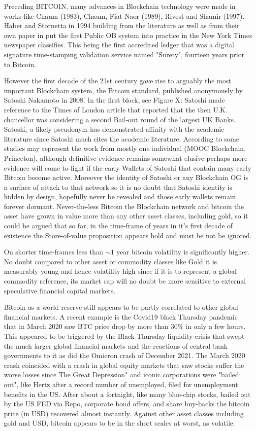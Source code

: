 \documentclass[final,5p,times,twocolumn,authoryear]{elsarticle}
\begin{document}
Preceding BITCOIN, many advances in Blockchain technology were made in works like Chaum (1983), Chaum, Fiat Naor (1989), Rivest and Shamir (1997). Haber and Stornetta in 1994 building from the literature as well as from their own paper in \cite{Haber1991wi} put the first Public OB system into practice in the New York Times newspaper classifies. This being the first accredited ledger that was a digital signature time-stamping validation service named "Surety", fourteen years prior to Bitcoin. 

However the first decade of the 21st century gave rise to arguably the most important Blockchain system, the Bitcoin standard, published anonymously by Satoshi Nakamoto in 2008.  In the first block, see Figure X: Satoshi made reference to the Times of London article that reported that the then U.K. chancellor was considering a second Bail-out round of the largest UK Banks. Satoshi, a likely pseudonym has demonstrated affinity with the academic literature since Satoshi much cites the academic literature. According to some studies may represent the work from mostly one individual (MOOC Blockchain, Princeton), although definitive evidence remains somewhat elusive perhaps more evidence will come to light if the early Wallets of Satoshi that contain many early Bitcoin become active. Moreover the identity of Satoshi or any Blockchain OG is a surface of attack to that network so it is no doubt that Satoshi identity is hidden by design, hopefully never be revealed and those early wallets remain forever dormant. Never-the-less Bitcoin the Blockchain network and bitcoin the asset have grown in value more than any other asset classes, including gold, so it could be argued that so far, in the time-frame of years in it's first decade of existence the Store-of-value proposition appears hold and must be not be ignored.

On shorter time-frames less than $\sim 1$ year bitcoin volatility is significantly higher. No doubt compared to other asset or commodity classes like Gold it is measurably young and hence volatility high since if it is to represent a global commodity reference, its market cap will no doubt be more sensitive to external speculative financial capital markets. 

Bitcoin as a world reserve still appears to be partly correlated to other global financial markets. A recent example is the Covid19 black Thursday pandemic that in March 2020 saw BTC price drop by more than 30\% in only a few hours. This appeared to be triggered by the Black Thursday liquidity crisis that swept the much larger global financial markets and the reactions of central bank governments to it as did the Omicron crash of December 2021. The March 2020 crash coincided with a crash in global equity markets that saw stocks suffer the worse losses since The Great Depression" and iconic corporations were "bailed out", like Hertz after a record number of unemployed, filed for unemployment benefits in the US. After about a fortnight, like many blue-chip stocks, bailed out by the US FED via Repo, corporate bond offers, and share buy-backs the bitcoin price (in USD) recovered almost instantly. Against other asset classes including gold and USD, bitcoin appears to be in the short scales at worst, as volatile. 
 
\end{document}
